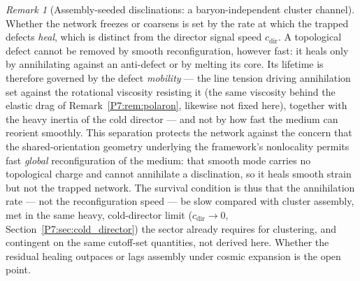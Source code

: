 \documentclass[11pt,a4paper]{article}
\theoremstyle{definition}
\theoremstyle{remark}
\newtheorem{remark}[theorem]{Remark}
\begin{document}
\begin{remark}[Assembly-seeded disclinations: a baryon-independent cluster channel]
Whether the network freezes or coarsens is set by the rate at which the
trapped defects \emph{heal}, which is distinct from the director signal
speed $c_{\mathrm{dir}}$.  A topological defect cannot be removed by smooth
reconfiguration, however fast: it heals only by annihilating against an
anti-defect or by melting its core.  Its lifetime is therefore governed by
the defect \emph{mobility} --- the line tension driving annihilation set
against the rotational viscosity resisting it (the same viscosity behind the
elastic drag of Remark~\ref{P7:rem:polaron}, likewise not fixed here),
together with the heavy inertia of the cold director --- and not by how fast
the medium can reorient smoothly.  This separation protects the network
against the concern that the shared-orientation geometry underlying the
framework's nonlocality permits fast \emph{global} reconfiguration of the
medium: that smooth mode carries no topological charge and cannot annihilate
a disclination, so it heals smooth strain but not the trapped network.  The
survival condition is thus that the annihilation rate --- not the
reconfiguration speed --- be slow compared with cluster assembly, met in the
same heavy, cold-director limit ($c_{\mathrm{dir}}\to0$,
Section~\ref{P7:sec:cold_director}) the sector already requires for
clustering, and contingent on the same cutoff-set quantities, not derived
here.  Whether the residual healing outpaces or lags assembly under cosmic
expansion is the open point.


\end{remark}
\end{document}
